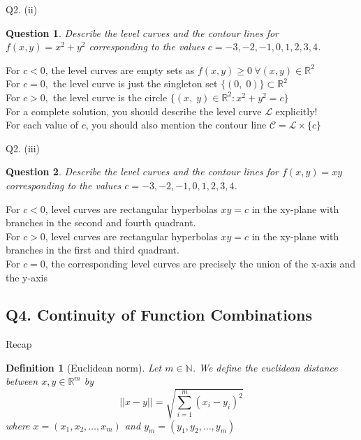\documentclass[aspectratio=169]{beamer}
\newtheorem{df}{Definition}
\newtheorem{qsn}{Question}
\newcommand{\bN}{\mathbb{N}}
\newcommand{\bR}{\mathbb{R}}
\newcommand{\normtwo}[1]{||#1||}
\begin{document}
\begin{frame}{Q2. (ii)}
	\begin{qsn}
        Describe the level curves and the contour lines for $f(x,y) = x^2+y^2$ corresponding to the values $c=-3,-2,-1,0,1,2,3,4$.
	\end{qsn}
     {
    \vspace*{1mm}
	 For $ c < 0$, the level curves are empty sets as $f(x,y) \geq 0 ~\forall (x,y) \in \mathbb{R}^2$\\[1mm]
    }
	\uncover<3-> {
	For $c = 0,$ the level curve is just the singleton set $\{(0,\;0)\}\subset \mathbb{R}^2$\\[1mm]
	}
	\uncover<4-> {
    For $c > 0,$ the level curve is the circle $\{(x,\;y)\in\mathbb{R}^2:x^2 + y^2 = c\}$\\[2mm]
    }
     {
    For a complete solution, you should describe the level curve $\mathcal{L}$ explicitly!\\
    }
     {
    For each value of $c$, you should also mention the contour line $\mathcal{C} = \mathcal{L}\times \{c\}$
    }
\end{frame}

\begin{frame}{Q2. (iii)}
    \begin{qsn}
        Describe the level curves and the contour lines for $f(x,y) = xy$ corresponding to the values $c=-3,-2,-1,0,1,2,3,4$.
	\end{qsn}
	 {
	\vspace*{1mm}
	 For $c < 0$, level curves are rectangular hyperbolas $xy = c$ in the xy-plane with branches in the second and fourth quadrant. \\[1mm]
    }
	\uncover<3-> {
    For $c > 0$, level curves are rectangular hyperbolas $xy = c$ in the xy-plane with branches in the first and third quadrant. \\[1mm]
    }
	\uncover<4-> {
    For $c = 0$, the corresponding level curves are precisely the union of the x-axis and the y-axis
    }
\end{frame}

\subsection{Q4. Continuity of Function Combinations}

\begin{frame}{Recap}
 {
\begin{df}[Euclidean norm]
Let $m\in \bN$. We define the euclidean distance between $x,y \in \bR^m$ by
$$\normtwo{x-y} = \sqrt{\sum_{i=1}^m (x_i-y_i)^2}$$
where $x=(x_1,x_2,\dots,x_m)$ and $y_m = (y_1,y_2,\dots,y_m)$
\end{df}
}
\end{frame}
\end{document}
